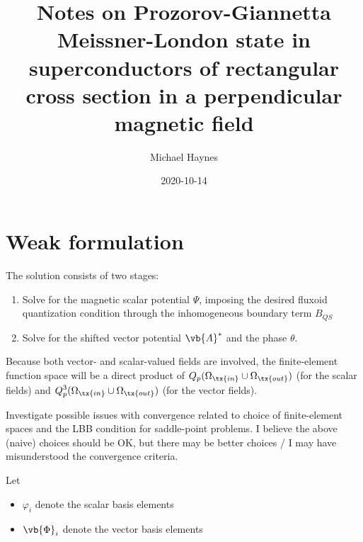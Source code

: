 \documentclass{pset}
\begin{document}
\author{Michael Haynes}
\title{Notes on Prozorov-Giannetta \\ Meissner-London state in superconductors of rectangular cross section in a perpendicular magnetic field} 
\date{2020-10-14}
\maketitle

\section{Weak formulation}

The solution consists of two stages:
\begin{enumerate}[label=(\Alph*)]
	\item Solve for the magnetic scalar potential $\displaystyle \Psi$, imposing the desired fluxoid quantization condition through the inhomogeneous boundary term $\displaystyle B_{QS}$ \label{first-part}
	\item Solve for the shifted vector potential $\displaystyle \vb{A}^{*}$ and the phase $\displaystyle \theta$. \label{second-part}
\end{enumerate}

Because both vector- and scalar-valued fields are involved, the finite-element function space will be a direct product of $\displaystyle Q_p(\Omega_{\tx{in}} \cup \Omega_{\tx{out}})$ (for the scalar fields) and $\displaystyle Q_p^{3}(\Omega_{\tx{in}} \cup \Omega_{\tx{out}})$ (for the vector fields).

\begin{todo}
	Investigate possible issues with convergence related to choice of finite-element spaces and the LBB condition for saddle-point problems.  I believe the above (naive) choices should be OK, but there may be better choices / I may have misunderstood the convergence criteria.
\end{todo}


\begin{definition*} \label{defn:basis-functions}
	Let 
	\begin{itemize}
	  \item $\displaystyle \varphi_i$ denote the scalar basis elements
		  \item $\displaystyle \vb{\Phi}_i$ denote the vector basis elements
	\end{itemize}
\end{definition*}
\end{document}
